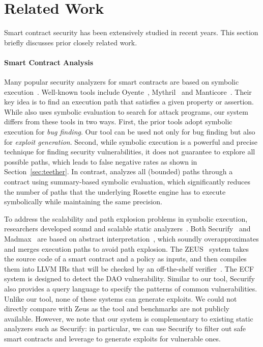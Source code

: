 \section{Related Work}
Smart contract security has been extensively studied in recent years. 
This section briefly discusses prior closely related work.

\paragraph{Smart Contract Analysis}
Many popular security analyzers for smart contracts are based on symbolic
execution~\cite{symbolic-e}. Well-known tools include Oyente~\cite{oyente},
Mythril~\cite{mythril} and Manticore~\cite{manticore}. Their key idea is to find
an execution path that satisfies a given property or assertion. While \toolname
also uses symbolic evaluation to search for attack programs, our system differs
from these tools in two ways. First, the prior tools adopt symbolic execution
for \emph{bug finding}. Our tool can be used not only for bug finding but also
for \emph{exploit generation}. Second, while symbolic execution is a powerful
and precise technique for finding security vulnerabilities, it does not
guarantee to explore all possible paths, which leads to false negative rates as
shown in Section~\ref{sec:teether}. In contrast, \toolname analyzes all
(bounded) paths through a contract using summary-based symbolic evaluation,
which significantly reduces the number of paths that the underlying Rosette
engine has to execute symbolically while maintaining the same precision.

To address the scalability and path explosion problems in symbolic execution,
researchers developed sound and scalable static
analyzers~\cite{ecf,securify,madmax,zeus}. Both Securify~\cite{securify} and
Madmax~\cite{madmax} are based on abstract interpretation~\cite{CousotC77},
which soundly overapproximates and merges execution paths to avoid path
explosion. The ZEUS~\cite{zeus} system takes the source code of a smart contract
and a policy as inputs, and then compiles them into LLVM IRs that will be
checked by an off-the-shelf verifier~\cite{smack}. The ECF~\cite{ecf} system is
designed to detect the DAO vulnerability. Similar to our tool, Securify also
provides a query language to specify the patterns of common vulnerabilities.
Unlike our tool, none of these systems can generate exploits. We could not
directly compare \toolname with Zeus as the tool and benchmarks
are not publicly available. However, we note that our system is complementary to
existing static analyzers such as Securify: in particular, we can use Securify
to filter out safe smart contracts and leverage \toolname to generate exploits
for vulnerable ones.

